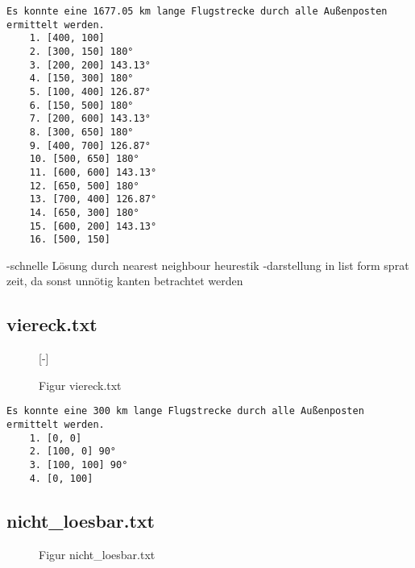 \documentclass[a4paper,10pt,ngerman]{scrartcl}
\begin{document}
    \begin{lstlisting}[frame=single, title=Programmausgabe kreis.txt, breaklines=true,label={lst:lstlisting}]
    Es konnte eine 1677.05 km lange Flugstrecke durch alle Außenposten ermittelt werden.
    1. [400, 100]
    2. [300, 150] 180°
    3. [200, 200] 143.13°
    4. [150, 300] 180°
    5. [100, 400] 126.87°
    6. [150, 500] 180°
    7. [200, 600] 143.13°
    8. [300, 650] 180°
    9. [400, 700] 126.87°
    10. [500, 650] 180°
    11. [600, 600] 143.13°
    12. [650, 500] 180°
    13. [700, 400] 126.87°
    14. [650, 300] 180°
    15. [600, 200] 143.13°
    16. [500, 150]
    \end{lstlisting}

    -schnelle Lösung durch nearest neighbour heurestik
    -darstellung in list form sprat zeit, da sonst unnötig kanten betrachtet werden

    \subsection{viereck.txt}\label{subsec:viereck.txt}

    \begin{figure}[H]
        [-]
        \FigurFuenf{}
        \caption{Figur viereck.txt}
        \label{fig:Figure3}
    \end{figure}

    \begin{lstlisting}[frame=single, title=Programmausgabe viereck.txt, breaklines=true,label={lst:lstlisting3}]
    Es konnte eine 300 km lange Flugstrecke durch alle Außenposten ermittelt werden.
    1. [0, 0]
    2. [100, 0] 90°
    3. [100, 100] 90°
    4. [0, 100]
    \end{lstlisting}

    \subsection{nicht\_loesbar.txt}\label{subsec:nichtloesbar.txt}


    \begin{figure}[H]
        \centering
        \caption{Figur nicht\_loesbar.txt}
        \label{fig:Figure4}
    \end{figure}
\end{document}
